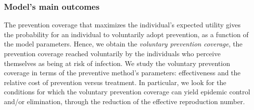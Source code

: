 \subsubsection{Model's main outcomes}
The prevention coverage that maximizes the individual's expected utility gives the probability for an individual to voluntarily adopt prevention, as a function of the model parameters. Hence, we obtain the {\it voluntary prevention coverage}, the prevention coverage reached voluntarily by the individuals who perceive themselves as being at risk of infection. 
%
We study the voluntary prevention coverage in terms of the preventive method's parameters: effectiveness and the relative cost of prevention versus treatment. In particular, we look for the conditions for which the voluntary prevention coverage can yield epidemic control and/or elimination, through the reduction of the effective reproduction number.

